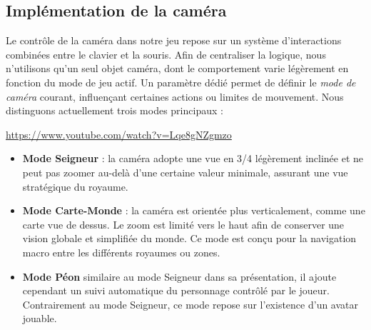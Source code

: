 \subsection{Implémentation de la caméra}

Le contrôle de la caméra dans notre jeu repose sur un système d’interactions combinées entre le clavier et la souris. Afin de centraliser la logique, nous n’utilisons qu’un seul objet caméra, dont le comportement varie légèrement en fonction du mode de jeu actif. Un paramètre dédié permet de définir le \textit{mode de caméra} courant, influençant certaines actions ou limites de mouvement. Nous distinguons actuellement trois modes principaux :

\url{https://www.youtube.com/watch?v=Lqe8gNZgmzo}

\begin{itemize}
    \item \textbf{Mode Seigneur} : la caméra adopte une vue en 3/4 légèrement inclinée et ne peut pas zoomer au-delà d’une certaine valeur minimale, assurant une vue stratégique du royaume.
    
    \item \textbf{Mode Carte-Monde} : la caméra est orientée plus verticalement, comme une carte vue de dessus. Le zoom est limité vers le haut afin de conserver une vision globale et simplifiée du monde. Ce mode est conçu pour la navigation macro entre les différents royaumes ou zones.

    \item \textbf{Mode Péon} similaire au mode Seigneur dans sa présentation, il ajoute cependant un suivi automatique du personnage contrôlé par le joueur. Contrairement au mode Seigneur, ce mode repose sur l’existence d’un avatar jouable.
\end{itemize}

